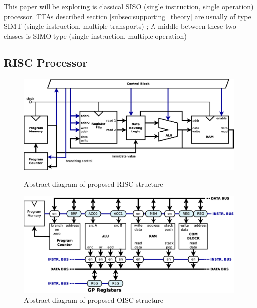 This paper will be exploring is classical SISO (single instruction, single operation) processor. TTAs described section \ref{subsec:supporting_theory} are usually of type SIMT (single instruction, multiple transports) \autocite{289981}; A middle between these two classes is SIMO type (single instruction, multiple operation)

\subsection{RISC Processor}

\begin{figure}[b!]
	\centering
	\includegraphics[width=\linewidth]{../resources/risc.eps}
	\caption{Abstract diagram of proposed RISC structure}
	\label{fig:risc_simple}
	
	\vspace{1cm}
	
	\includegraphics[width=\linewidth]{../resources/oisc.eps}
	\caption{Abstract diagram of proposed OISC structure}
	\label{fig:oisc_simple}
\end{figure}

